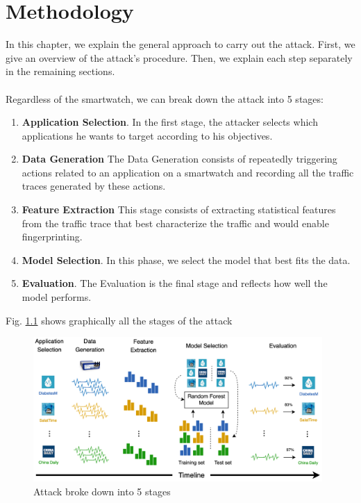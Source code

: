 \chapter{Methodology}
\label{chap:methodology}



In this chapter, we explain the general approach to carry out the attack. First, we give an overview of the attack's procedure. Then, we explain each step separately in the remaining sections. 
\\
\\

Regardless of the smartwatch, we can break down the attack into 5 stages: 

\begin{enumerate}
    
    \item \textbf{Application Selection}. In the first stage, the attacker selects which applications he wants to target according to his objectives.
    
    \item \textbf{Data Generation} The Data Generation consists of repeatedly triggering actions related to an application on a smartwatch and recording all the traffic traces generated by these actions.
    
    \item \textbf{Feature Extraction} This stage consists of extracting statistical features from the traffic trace that best characterize the traffic and would enable fingerprinting.
    
    \item \textbf{Model Selection}. In this phase, we select the model that best fits the data. 
    
    \item \textbf{Evaluation}. The Evaluation is the final stage and reflects how well the model performs.
    
\end{enumerate}

Fig. \ref{fig:attack_p1} shows graphically all the stages of the attack

\begin{figure}[H]
 \centering
 \includegraphics[width=0.98\textwidth]{figures/methodology.png}
 \caption{Attack broke down into 5 stages}
 \label{fig:attack_p1}
\end{figure}


